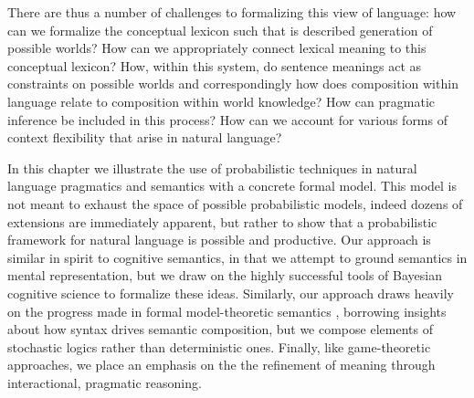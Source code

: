 \documentclass[pdfextras]{handbook}
\begin{document}
There are thus a number of challenges to formalizing this view of language: how can we formalize the conceptual lexicon such that is described generation of possible worlds? How can we appropriately connect lexical meaning to this conceptual lexicon? How, within this system, do sentence meanings act as constraints on possible worlds and correspondingly how does composition within language relate to composition within world knowledge?  How can pragmatic inference be included in this process? How can we account for various forms of context flexibility that arise in natural language?




In this chapter we illustrate the use of probabilistic techniques in natural language pragmatics and semantics with a concrete formal model. This model is not meant to exhaust the space of possible probabilistic models, indeed dozens of extensions are immediately apparent, but rather to show that a probabilistic framework for natural language is possible and productive.
Our approach is similar in spirit to cognitive semantics, in that we attempt to ground semantics in mental representation, but we draw on the highly successful tools of Bayesian cognitive science to formalize these ideas. 
Similarly, our approach draws heavily on the progress made in formal model-theoretic semantics \cite{montague1973,gamut90,heimkratzer1998}, borrowing insights about how syntax drives semantic composition, but we compose elements of stochastic logics rather than deterministic ones.
Finally, like game-theoretic approaches, we place an emphasis on the the refinement of meaning through interactional, pragmatic reasoning.
\end{document}
